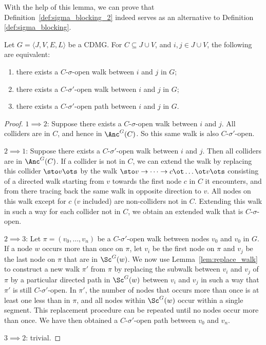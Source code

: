 With the help of this lemma, we can prove that Definition~\ref{def:sigma_blocking_2} indeed serves as an alternative to 
Definition \ref{def:sigma_blocking}.
\begin{Prp}\label{prp:sigma_opens}
  Let $G = \langle J, V, E, L \rangle$ be a CDMG. For $C \subseteq J \cup V$, and $i, j \in J \cup V$, the following are
  equivalent:
  \begin{enumerate}
    \item there exists a $C$-$\sigma$-open walk between $i$ and $j$ in $G$;
    \item there exists a $C$-$\sigma'$-open walk between $i$ and $j$ in $G$;
    \item there exists a $C$-$\sigma'$-open path between $i$ and $j$ in $G$.
  \end{enumerate}
\end{Prp}
\begin{proof}
$1 \implies 2$: Suppose there exists a $C$-$\sigma$-open walk between $i$ and $j$.
All colliders are in $C$, and hence in $\Anc^G(C)$. So this same walk is also $C$-$\sigma'$-open. 

$2 \implies 1$: Suppose there exists a $C$-$\sigma'$-open walk between $i$ and $j$. 
Then all colliders are in $\Anc^G(C)$. If a collider is not in $C$, we can extend the walk by replacing this collider 
$\sto v \ots$ by the walk 
$\sto v \to \dots \to c \ot \dots \ot v \ots$ consisting of a directed walk starting from $v$ towards the first
node $c$ in $C$ it encounters, and from there tracing back the same walk in opposite direction to $v$. All nodes on this
walk except for $c$ ($v$ included) are non-colliders not in $C$. Extending this walk in such a way for each
collider not in $C$, we obtain an extended walk that is $C$-$\sigma$-open.

$2 \implies 3$:
Let $\pi = (v_0,\dots,v_n)$ be a $C$-$\sigma'$-open walk between nodes $v_0$ and $v_0$ in $G$. 
If a node $w$ occurs more than once on $\pi$, let $v_i$ be the first node on $\pi$ and $v_j$ be the last node on $\pi$ that are in $\Sc^G(w)$.
We now use Lemma~\ref{lem:replace_walk} to construct a new walk $\pi'$ from $\pi$ by replacing the subwalk between $v_i$ and $v_j$ of $\pi$ by a particular directed path in $\Sc^G(w)$ between $v_i$ and $v_j$ in such a way that $\pi'$ is still $C$-$\sigma'$-open.
In $\pi'$, the number of nodes that occurs more than once is at least one less than in $\pi$, and all nodes within $\Sc^G(w)$ occur within a single segment.
This replacement procedure can be repeated until no nodes occur more than once. We have then obtained a
$C$-$\sigma'$-open path between $v_0$ and $v_n$.

$3 \implies 2$: trivial.
\end{proof}
